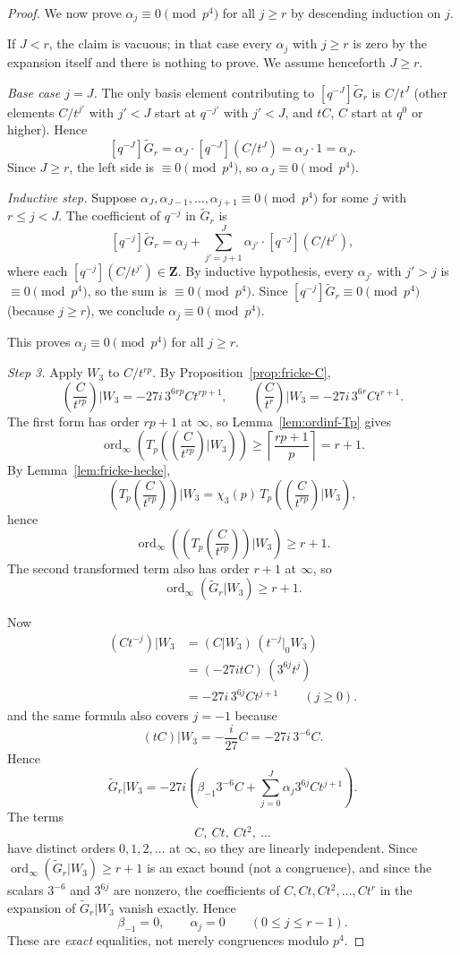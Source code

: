 \documentclass[10pt,a4paper]{amsart}
\DeclareMathOperator{\ord}{ord}
\newcommand{\Z}{\mathbf{Z}}
\begin{document}
\begin{proof}
We now prove $\alpha_j\equiv0\pmod{p^4}$ for all $j\ge r$ by descending induction on $j$.

If $J<r$, the claim is vacuous; in that case every $\alpha_j$ with $j\ge r$ is zero by the expansion
itself and there is nothing to prove. We assume henceforth $J\ge r$.

\emph{Base case $j=J$.} The only basis element contributing to $[q^{-J}]\widetilde G_r$ is $C/t^J$
(other elements $C/t^{j'}$ with $j'<J$ start at $q^{-j'}$ with $j'<J$, and $tC$, $C$ start at
$q^0$ or higher). Hence
\[
[q^{-J}]\widetilde G_r=\alpha_J\cdot[q^{-J}](C/t^J)=\alpha_J\cdot 1=\alpha_J.
\]
Since $J\ge r$, the left side is $\equiv0\pmod{p^4}$, so $\alpha_J\equiv0\pmod{p^4}$.

\emph{Inductive step.} Suppose $\alpha_J,\alpha_{J-1},\ldots,\alpha_{j+1}\equiv0\pmod{p^4}$ for some
$j$ with $r\le j<J$. The coefficient of $q^{-j}$ in $\widetilde G_r$ is
\[
[q^{-j}]\widetilde G_r
=
\alpha_j+\sum_{j'=j+1}^{J}\alpha_{j'}\cdot[q^{-j}](C/t^{j'}),
\]
where each $[q^{-j}](C/t^{j'})\in\Z$. By inductive hypothesis, every $\alpha_{j'}$ with $j'>j$ is
$\equiv0\pmod{p^4}$, so the sum is $\equiv0\pmod{p^4}$. Since $[q^{-j}]\widetilde G_r\equiv0\pmod{p^4}$
(because $j\ge r$), we conclude $\alpha_j\equiv0\pmod{p^4}$.

This proves $\alpha_j\equiv0\pmod{p^4}$ for all $j\ge r$.

\emph{Step 3.} Apply $W_3$ to $C/t^{rp}$. By Proposition~\ref{prop:fricke-C},
\[
\left(\frac{C}{t^{rp}}\right)\Big|W_3
=
-27i\,3^{6rp}Ct^{rp+1},
\qquad
\left(\frac{C}{t^r}\right)\Big|W_3
=
-27i\,3^{6r}Ct^{r+1}.
\]
The first form has order $rp+1$ at $\infty$, so Lemma~\ref{lem:ordinf-Tp} gives
\[
\ord_\infty\!\left(
T_p\!\left(\left(\frac{C}{t^{rp}}\right)\Big|W_3\right)
\right)
\ge
\left\lceil\frac{rp+1}{p}\right\rceil
=
r+1.
\]
By Lemma~\ref{lem:fricke-hecke},
\[
\left(T_p\!\left(\frac{C}{t^{rp}}\right)\right)\Big|W_3
=
\chi_3(p)\,
T_p\!\left(\left(\frac{C}{t^{rp}}\right)\Big|W_3\right),
\]
hence
\[
\ord_\infty\!\left(
\left(T_p\!\left(\frac{C}{t^{rp}}\right)\right)\Big|W_3
\right)\ge r+1.
\]
The second transformed term also has order $r+1$ at $\infty$, so
\[
\ord_\infty(\widetilde G_r|W_3)\ge r+1.
\]

Now
\begin{align*}
(Ct^{-j})|W_3
&=
(C|W_3)\,(t^{-j}|_0W_3) \\
&=
(-27itC)\,(3^{6j}t^j) \\
&=
-27i\,3^{6j}Ct^{j+1}
\qquad (j\ge0).
\end{align*}
and the same formula also covers $j=-1$ because
\[
(tC)|W_3=-\frac{i}{27}C=-27i\,3^{-6}C.
\]
Hence
\[
\widetilde G_r|W_3
=
-27i\left(
\beta_{-1}3^{-6}C+\sum_{j=0}^{J}\alpha_j3^{6j}Ct^{j+1}
\right).
\]
The terms
\[
C,\ Ct,\ Ct^2,\ \dots
\]
have distinct orders $0,1,2,\dots$ at $\infty$, so they are linearly independent.
Since $\ord_\infty(\widetilde G_r|W_3)\ge r+1$ is an exact bound (not a congruence),
and since the scalars $3^{-6}$ and $3^{6j}$ are nonzero, the coefficients of
$C, Ct, Ct^2, \ldots, Ct^r$ in the expansion of $\widetilde G_r|W_3$ vanish exactly.
Hence
\[
\beta_{-1}=0,
\qquad
\alpha_j=0
\qquad (0\le j\le r-1).
\]
These are \emph{exact} equalities, not merely congruences modulo $p^4$.


\end{proof}
\end{document}
